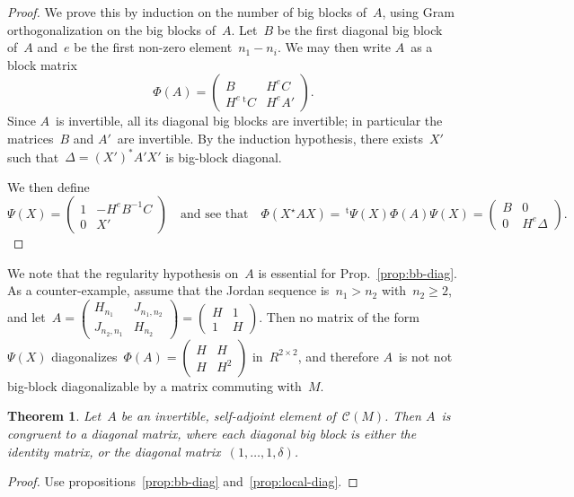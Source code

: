 \documentclass{article}%
\newtheorem{thm}{Theorem}
\let\ro\mathscr
\def\transpose{\,{}^{\mathrm{t}\!}}
\def\mat#1{\begin{pmatrix}#1\end{pmatrix}}
\begin{document}
\begin{proof}
We prove this by induction on the number of big blocks of~$A$, using Gram
orthogonalization on the big blocks of~$A$. Let~$B$ be the first diagonal
big block of~$A$ and~$e$ be the first non-zero element~$n_1 - n_i$. We
may then write $A$~as a block matrix
\begin{equation}
Φ(A) = \mat{B & H^{e} C\\ H^e\transpose{C} & H^e A'}.
\end{equation}
Since $A$~is invertible, all its diagonal big blocks are invertible; in
particular the matrices~$B$ and $A'$~are invertible. By the induction
hypothesis, there exists~$X'$ such that~$Δ = (X')^{*} A' X'$ is
big-block diagonal.

We then define
\begin{equation}
Ψ(X) = \mat{1 & -H^e B^{-1} C\\0 & X'}\quad\text{and see that}\quad
Φ(X^{⋆} A X) = \transpose{Ψ(X)} Φ(A) Ψ(X) = \mat{B & 0\\0 & H^e Δ}.
\end{equation}
\end{proof}

We note that the regularity hypothesis on~$A$ is essential for
Prop.~\ref{prop:bb-diag}. As a counter-example, assume that the Jordan
sequence is~$n_1 > n_2$ with~$n_2 ≥ 2$, and let~$A = \mat{H_{n_1} &
J_{n_1,n_2} \\ J_{n_2,n_1} & H_{n_2}} = \mat{H&1\\1&H}$.
Then no matrix of the form~$Ψ(X)$ diagonalizes~$Φ(A) = \mat{H&H\\H&H^2}$
in~$R^{2×2}$, and therefore $A$~is not not big-block diagonalizable by a
matrix commuting with~$M$.

\begin{thm}\label{thm:diag}
Let~$A$ be an invertible, self-adjoint element of~$\ro C(M)$. Then $A$~is
congruent to a diagonal matrix, where each diagonal big block is either
the identity matrix, or the diagonal matrix~$(1, …, 1, δ)$.
\end{thm}

\begin{proof}
Use propositions~\ref{prop:bb-diag} and~\ref{prop:local-diag}.
\end{proof}
\end{document}
